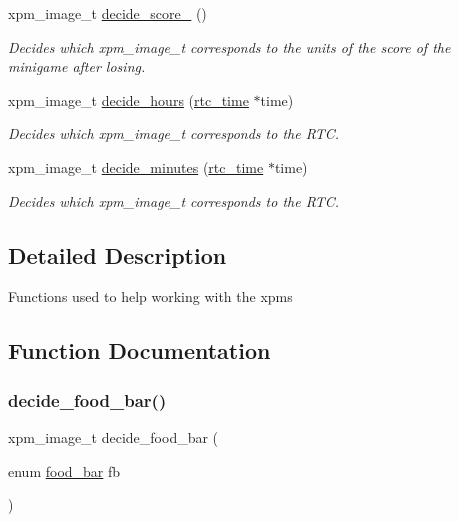 \begin{DoxyCompactItemize}
xpm\+\_\+image\+\_\+t \hyperlink{group__loading__xpms_ga49c14da168cc130190ad4808e0c889bf}{decide\+\_\+score\+\_} ()
\begin{DoxyCompactList}\small\item\em Decides which xpm\+\_\+image\+\_\+t corresponds to the units of the score of the minigame after losing. \end{DoxyCompactList}\item 
xpm\+\_\+image\+\_\+t \hyperlink{group__loading__xpms_ga62a40150916b92b39ae83d800e3612f1}{decide\+\_\+hours} (\hyperlink{structrtc__time}{rtc\+\_\+time} $\ast$time)
\begin{DoxyCompactList}\small\item\em Decides which xpm\+\_\+image\+\_\+t corresponds to the R\+TC. \end{DoxyCompactList}\item 
xpm\+\_\+image\+\_\+t \hyperlink{group__loading__xpms_gae641aba4324c1f6c45eccb9d01822bd4}{decide\+\_\+minutes} (\hyperlink{structrtc__time}{rtc\+\_\+time} $\ast$time)
\begin{DoxyCompactList}\small\item\em Decides which xpm\+\_\+image\+\_\+t corresponds to the R\+TC. \end{DoxyCompactList}\end{DoxyCompactItemize}


\subsection{Detailed Description}
Functions used to help working with the xpms 

\subsection{Function Documentation}
\mbox{\label{group__loading__xpms_ga2cdb6cdede927ad5a784d34d47577acf}} 
\subsubsection{\texorpdfstring{decide\+\_\+food\+\_\+bar()}{decide\_food\_bar()}}
{\footnotesize\ttfamily xpm\+\_\+image\+\_\+t decide\+\_\+food\+\_\+bar (\begin{DoxyParamCaption}\item[{enum \hyperlink{group__types_ga68b33015e0d4635ee8ddb795eca9d963}{food\+\_\+bar}}]{fb }\end{DoxyParamCaption})}



